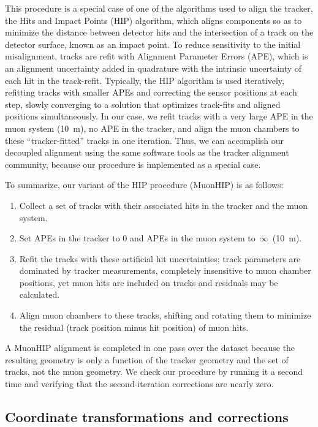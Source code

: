 \documentclass[12pt]{article}
\begin{document}
This procedure is a special case of one of the algorithms used to
align the tracker, the Hits and Impact Points (HIP) algorithm, which
aligns components so as to minimize the distance between detector hits
and the intersection of a track on the detector surface, known as an
impact point.  To reduce sensitivity to the initial misalignment,
tracks are refit with Alignment Parameter Errors (APE), which is an
alignment uncertainty added in quadrature with the intrinsic
uncertainty of each hit in the track-refit.  Typically, the HIP
algorithm is used iteratively, refitting tracks with smaller APEs and
correcting the sensor positions at each step, slowly converging to a
solution that optimizes track-fits and aligned positions
simultaneously.  In our case, we refit tracks with a very large APE in
the muon system (10~m), no APE in the tracker, and align the muon
chambers to these ``tracker-fitted'' tracks in one iteration.  Thus,
we can accomplish our decoupled alignment using the same software
tools as the tracker alignment community, because our procedure is
implemented as a special case.

To summarize, our variant of the HIP procedure (MuonHIP) is as
follows:
\begin{enumerate}
\item Collect a set of tracks with their associated hits in the
  tracker and the muon system.
\item Set APEs in the tracker to 0 and APEs in the muon system to~$\infty$~(10~m).
\item Refit the tracks with these artificial hit uncertainties; track
  parameters are dominated by tracker measurements, completely
  insensitive to muon chamber positions, yet muon hits are included on
  tracks and residuals may be calculated.
\item Align muon chambers to these tracks, shifting and rotating them
  to minimize the residual (track position minus hit position) of
  muon hits.
\end{enumerate}
A MuonHIP alignment is completed in one pass over the dataset because
the resulting geometry is only a function of the tracker geometry and
the set of tracks, not the muon geometry.  We check our procedure by
running it a second time and verifying that the second-iteration
corrections are nearly zero.

\subsection{Coordinate transformations and corrections}
\end{document}
